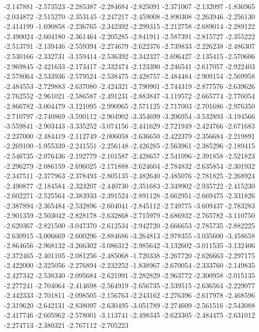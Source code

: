 -2.147881
-2.573523
-2.285387
-2.284684
-2.825091
-2.371067
-2.132097
-1.836965
-2.034872
-2.515270
-2.353145
-2.247217
-2.459008
-2.890308
-2.263946
-2.256130
-2.414199
-1.690858
-2.236765
-2.342392
-2.299315
-2.212758
-2.689014
-2.289122
-2.490024
-2.604180
-2.361464
-2.205285
-2.841911
-2.587391
-2.815727
-2.355222
-2.513791
-2.139446
-2.559394
-2.274679
-2.622376
-2.739833
-2.226238
-2.486307
-2.530166
-2.332731
-3.159414
-2.536392
-2.342327
-2.696427
-2.135415
-2.570606
-2.969845
-2.421633
-2.173417
-2.332474
-2.123390
-2.246541
-2.617057
-2.922403
-2.578064
-2.533936
-2.579524
-2.538475
-2.428757
-2.484484
-2.909154
-2.569958
-2.484553
-2.729883
-2.637080
-2.424321
-2.790901
-2.744319
-2.877576
-2.639626
-2.762552
-2.961021
-2.586587
-2.491231
-2.883847
-3.119572
-2.665774
-2.776054
-2.866782
-3.004479
-3.121095
-2.990965
-2.571125
-2.717003
-2.701686
-2.976350
-2.710797
-2.740869
-3.590112
-2.904902
-3.354699
-3.206954
-3.532893
-3.194566
-3.559841
-2.903443
-3.335252
-3.074156
-2.441629
-2.721949
-2.424766
-2.671683
-2.237000
-2.484419
-2.112749
-2.006058
-2.636650
-2.422379
-2.356684
-2.219891
-2.269100
-1.955339
-2.241551
-2.256148
-2.426285
-2.563961
-2.385296
-2.189415
-2.546735
-2.076436
-2.192779
-2.101587
-2.428657
-2.541096
-2.391858
-2.521823
-2.296279
-2.086159
-2.696025
-2.171888
-2.624604
-2.784832
-2.635854
-2.301932
-2.347511
-2.377963
-2.378493
-2.805135
-2.482640
-2.485076
-2.781825
-2.268924
-2.490877
-2.184584
-2.323207
-2.440730
-2.351683
-2.349902
-2.935722
-2.415230
-2.602271
-2.525564
-2.383933
-2.391524
-2.891128
-2.662951
-2.669475
-2.331826
-2.387894
-2.365484
-2.532896
-2.604041
-2.845112
-2.749775
-3.609437
-2.783283
-2.901359
-2.503042
-2.828178
-2.632868
-2.715979
-2.686932
-2.765782
-3.110750
-2.620367
-2.821500
-3.047370
-2.612534
-2.942720
-2.666653
-2.785735
-2.882225
-2.630915
-3.006669
-2.600296
-2.884686
-3.264813
-2.978355
-3.035600
-3.458658
-2.864656
-2.968132
-3.266302
-3.086312
-2.985642
-3.132602
-3.011535
-3.132406
-2.372465
-2.401105
-2.081256
-2.485068
-1.720338
-2.267720
-2.626663
-2.297175
-2.422000
-2.325056
-2.276894
-2.232252
-1.838967
-2.670054
-2.333760
-2.149835
-2.427342
-2.538340
-2.095684
-2.621991
-2.282829
-2.963772
-2.300958
-2.015135
-2.277241
-2.704064
-2.414698
-2.564919
-2.656735
-2.539515
-2.636564
-2.229077
-2.442333
-2.701811
-2.098505
-2.156763
-2.243162
-2.276396
-2.617978
-2.468596
-2.319620
-2.642131
-2.838097
-2.630495
-3.051789
-2.274609
-2.561516
-2.543088
-2.417746
-2.605962
-2.578001
-3.113741
-2.498345
-2.623305
-2.484475
-2.631012
-2.274713
-2.380321
-2.767112
-2.705223
